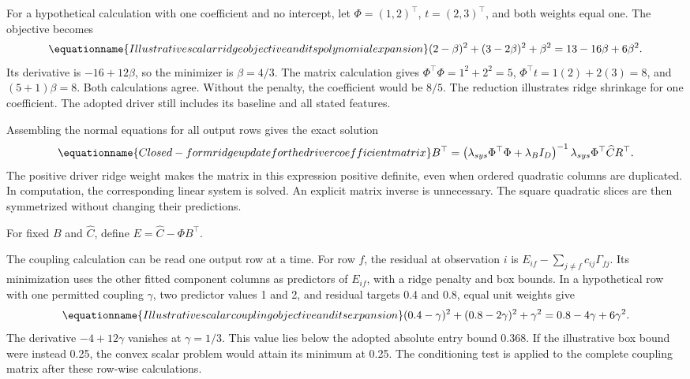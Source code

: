 For a hypothetical calculation with one coefficient and no intercept, let \(\Phi=(1,2)^\top\), \(t=(2,3)^\top\), and both weights equal one. The objective becomes
\begin{equation}
\equationname{Illustrative scalar ridge objective and its polynomial expansion}
\label{eq:icsor_ridge_numeric_example}
(2-\beta)^2+(3-2\beta)^2+\beta^2
=13-16\beta+6\beta^2.
\end{equation}
Its derivative is \(-16+12\beta\), so the minimizer is \(\beta=4/3\). The matrix calculation gives \(\Phi^\top\Phi=1^2+2^2=5\), \(\Phi^\top t=1(2)+2(3)=8\), and \((5+1)\beta=8\). Both calculations agree. Without the penalty, the coefficient would be \(8/5\). The reduction illustrates ridge shrinkage for one coefficient. The adopted driver still includes its baseline and all stated features.

Assembling the normal equations for all output rows gives the exact solution
\begin{equation}
\equationname{Closed-form ridge update for the driver coefficient matrix}
\label{eq:icsor_ridge_update}
B^\top=
\left(\lambda_{sys}\Phi^\top\Phi+\lambda_B I_D\right)^{-1}
\lambda_{sys}\Phi^\top\widehat C R^\top.
\end{equation}
The positive driver ridge weight makes the matrix in this expression positive definite, even when ordered quadratic columns are duplicated. In computation, the corresponding linear system is solved. An explicit matrix inverse is unnecessary. The square quadratic slices are then symmetrized without changing their predictions.

For fixed \(B\) and \(\widehat C\), define \(E=\widehat C-\Phi B^\top\).

The coupling calculation can be read one output row at a time. For row \(f\), the residual at observation \(i\) is \(E_{if}-\sum_{j\neq f}\widehat c_{ij}\Gamma_{fj}\). Its minimization uses the other fitted component columns as predictors of \(E_{if}\), with a ridge penalty and box bounds. In a hypothetical row with one permitted coupling \(\gamma\), two predictor values 1 and 2, and residual targets 0.4 and 0.8, equal unit weights give
\begin{equation}
\equationname{Illustrative scalar coupling objective and its expansion}
\label{eq:icsor_coupling_numeric_update}
(0.4-\gamma)^2+(0.8-2\gamma)^2+\gamma^2
=0.8-4\gamma+6\gamma^2.
\end{equation}
The derivative \(-4+12\gamma\) vanishes at \(\gamma=1/3\). This value lies below the adopted absolute entry bound 0.368. If the illustrative box bound were instead 0.25, the convex scalar problem would attain its minimum at 0.25. The conditioning test is applied to the complete coupling matrix after these row-wise calculations.

